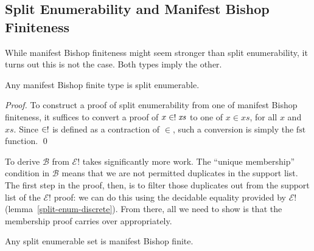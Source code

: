 \subsection{Split Enumerability and Manifest Bishop Finiteness}
While manifest Bishop finiteness might seem stronger than split enumerability,
it turns out this is not the case.
Both types imply the other.
\begin{romlemma} \label{manifest-bishop-to-split-enum}
  Any manifest Bishop finite type is split enumerable.
\end{romlemma}
\begin{proof}
  To construct a proof of split enumerability from one of manifest Bishop
  finiteness, it suffices to convert a proof of \(x \inunique \mathit{xs}\) to
  one of \(x \in \mathit{xs}\), for all \(x\) and \(\mathit{xs}\).
  Since \(\inunique\) is defined as a contraction of \(\in\), such a conversion
  is simply the \(\text{fst}\) function.
  \qed
\end{proof}

To derive \(\mathcal{B}\) from \(\mathcal{E}!\) takes significantly more work.
The ``unique membership'' condition in \(\mathcal{B}\) means that we are not
permitted duplicates in the support list.
The first step in the proof, then, is to filter those duplicates out from the
support list of the \(\mathcal{E}!\) proof: we can do this using the decidable
equality provided by \(\mathcal{E}!\) (lemma~\ref{split-enum-discrete}).
From there, all we need to show is that the membership proof carries over
appropriately.
\begin{romlemma} \label{split-enum-to-manifest-bishop}
  Any split enumerable set is manifest Bishop finite.
\end{romlemma}
